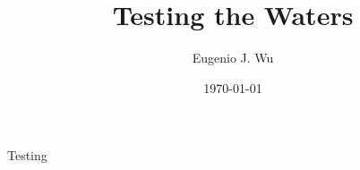 \documentclass[11pt]{article}
\title{Testing the Waters}
\author{Eugenio J. Wu}
\date{\today}
\begin{document}
\maketitle \pagebreak

\tableofcontents \pagebreak


Testing
\end{document}
